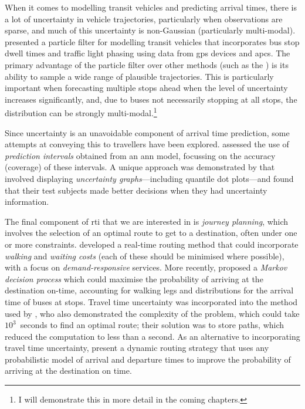 When it comes to modelling transit vehicles and predicting arrival times, there is a lot of uncertainty in vehicle trajectories, particularly when observations are sparse, and much of this uncertainty is non-Gaussian (particularly multi-modal).  presented a particle filter for modelling transit vehicles that incorporates bus stop dwell times and traffic light phasing using data from \gls{gps} devices and \glspl{apc}. The primary advantage of the particle filter over other methods (such as the \kf{}) is its ability to sample a wide range of plausible trajectories. This is particularly important when forecasting multiple stops ahead when the level of uncertainty increases significantly, and, due to buses not necessarily stopping at all stops, the distribution can be strongly multi-modal.\footnote{I will demonstrate this in more detail in the coming chapters.}


Since uncertainty is an unavoidable component of arrival time prediction, some attempts at conveying this to travellers have been explored.  assessed the use of \emph{prediction intervals} obtained from an \gls{ann} model, focussing on the accuracy (coverage) of these intervals. A unique approach was demonstrated by \citet{Fernandes_2018} that involved displaying \emph{uncertainty graphs}---including quantile dot plots---and found that their test subjects made better decisions when they had uncertainty information.


The final component of \gls{rti} that we are interested in is \emph{journey planning}, which involves the selection of an optimal route to get to a destination, often under one or more constraints.  developed a real-time routing method that could incorporate \emph{walking} and \emph{waiting costs} (each of these should be minimised where possible), with a focus on \emph{demand-responsive} services. More recently, \citet{Hame_2013a,Hame_2013b} proposed a \emph{Markov decision process} which could maximise the probability of arriving at the destination on-time, accounting for walking legs and distributions for the arrival time of buses at stops. Travel time uncertainty was incorporated into the method used by \citet{Zheng_2016}, who also demonstrated the complexity of the problem, which could take $10^3$~seconds to find an optimal route; their solution was to store paths, which reduced the computation to less than a second. As an alternative to incorporating travel time uncertainty, \citet{Berczi_2017} present a dynamic routing strategy that uses any probabilistic model of arrival and departure times to improve the probability of arriving at the destination on time.



